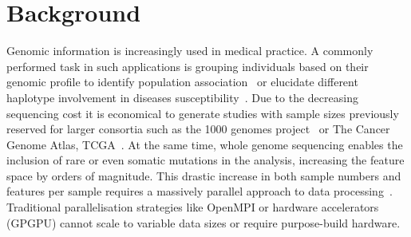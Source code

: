 \documentclass{bmcart}
\begin{document}


\section*{Background}

Genomic information is increasingly used in medical practice.
A commonly performed task in such applications is grouping individuals based on their genomic profile to identify population association~\cite{Gao2007} or elucidate different haplotype involvement in diseases susceptibility~\cite{Laitman2013}.  
Due to the decreasing sequencing cost it is economical to generate studies with sample sizes previously reserved for larger consortia such as the 1000 genomes project~\cite{1KG2012} or The Cancer Genome Atlas, TCGA~\cite{TCGA2013}. 
At the same time, whole genome sequencing enables the inclusion of rare or even somatic mutations in the analysis, increasing the feature space by orders of magnitude. This drastic increase in both sample numbers and features per sample requires a massively parallel approach to data processing~\cite{Stein2010}. Traditional parallelisation strategies like OpenMPI or hardware accelerators (GPGPU) cannot scale to variable data sizes or require purpose-build hardware.
 
\end{document}
